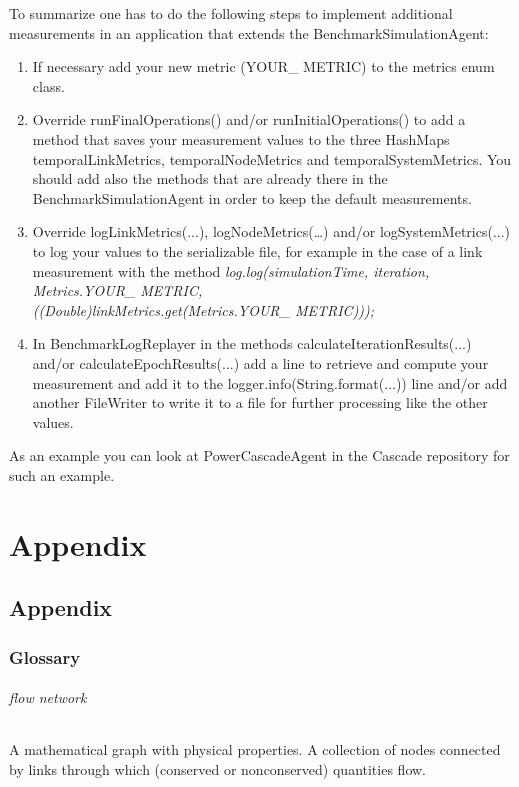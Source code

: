 \documentclass[11pt,fleqn]{book} %
\newcommand{\BenchmarkAgent}{BenchmarkSimulationAgent}
\newcommand{\BenchmarkLogReplayer}{BenchmarkLogReplayer}
\newcommand{\CascadeAgent}{CascadeAgent}
\begin{document}
To summarize one has to do the following steps to implement additional measurements in an application that extends the \BenchmarkAgent{}:
\begin{enumerate}
	\item If necessary add your new metric (YOUR\_ METRIC) to the metrics enum class.
	\item Override runFinalOperations() and/or runInitialOperations() to add a method that saves your measurement values to the three HashMaps temporalLinkMetrics, temporalNodeMetrics and temporalSystemMetrics. You should add also the methods that are already there in the \BenchmarkAgent{} in order to keep the default measurements.
	\item Override logLinkMetrics(...), logNodeMetrics(\dots) and/or logSystemMetrics(...) to log your values to the serializable file, for example in the case of a link measurement with the method \textit{ log.log(simulationTime, iteration, Metrics.YOUR\_ METRIC, \\
	((Double)linkMetrics.get(Metrics.YOUR\_ METRIC)));}
	\item In \BenchmarkLogReplayer{} in the methods calculateIterationResults(...) and/or calculateEpochResults(...) add a line to retrieve and compute your measurement and add it to the logger.info(String.format(...)) line and/or add another FileWriter to write it to a file for further processing like the other values.
\end{enumerate}
As an example you can look at Power\CascadeAgent{} in the Cascade repository for such an example.




\part{Appendix}

\chapter{Appendix}

\section{Glossary}
\paragraph{flow network}
A mathematical graph with physical properties. A collection of nodes connected by links through which (conserved or nonconserved) quantities flow.
\end{document}
